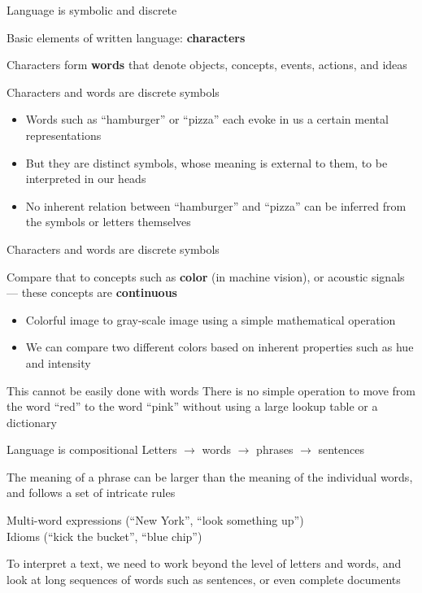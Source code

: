 \documentclass[12pt,aspectratio=169,handout]{beamer}
\begin{document}
\begin{frame}{Language is symbolic and discrete}
	
	Basic elements of written language: \textbf{characters}
	
	Characters form \textbf{words} that denote objects, concepts, events, actions, and ideas
	
	\begin{block}{Characters and words are discrete symbols}
		\begin{itemize}
			\item Words such as ``hamburger'' or ``pizza'' each evoke in us a certain mental representations
			\item But they are distinct symbols, whose meaning is external to them, to be interpreted in our heads
			\item No inherent relation between ``hamburger'' and ``pizza'' can be inferred from the symbols or letters themselves
		\end{itemize}
	\end{block}
	
\end{frame}

\begin{frame}{Characters and words are discrete symbols}
	
	Compare that to concepts such as \textbf{color} (in machine vision), or acoustic
	signals --- these concepts are \textbf{continuous}
	
	\begin{itemize}
		\item Colorful image to gray-scale image using a simple mathematical operation
		\item We can compare two different colors based on inherent properties such as hue and intensity
	\end{itemize}
	
	\begin{block}{This cannot be easily done with words}
		There is no simple operation to move from the word ``red'' to the word ``pink'' without using a large lookup table or a dictionary
	\end{block}
	
\end{frame}


\begin{frame}{Language is compositional}
	Letters $\to$ words $\to$ phrases $\to$ sentences
	
	The meaning of a phrase can be larger than the meaning of the individual words,	and follows a set of intricate rules
	
	\begin{example}
		Multi-word expressions (``New York'', ``look something up'') \\
		Idioms (``kick the bucket'', ``blue chip'')
	\end{example}
	
	To interpret a text, we need to work beyond the level of letters and words, and look at long sequences of words such as sentences, or even complete documents
\end{frame}
\end{document}
